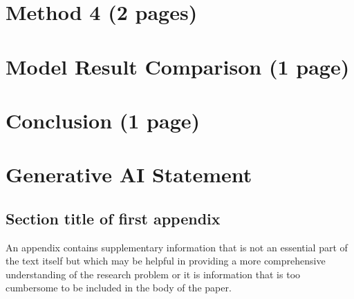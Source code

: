 \documentclass[pdflatex,sn-mathphys-num, oneside]{sn-jnl}%
\theoremstyle{thmstyleone}%
\theoremstyle{thmstyletwo}%
\theoremstyle{thmstylethree}%
\begin{document}
\clearpage

\section{Method 4 (2 pages)}\label{sec3}

\clearpage

\section{Model Result Comparison (1 page)}\label{sec3}

\clearpage

\section{Conclusion (1 page)}\label{sec3}

\clearpage


\clearpage

\section{Generative AI Statement}

\clearpage

\begin{appendices}

\section{Section title of first appendix}\label{secA1}

An appendix contains supplementary information that is not an essential part of the text itself but which may be helpful in providing a more comprehensive understanding of the research problem or it is information that is too cumbersome to be included in the body of the paper.




\end{appendices}
\end{document}
